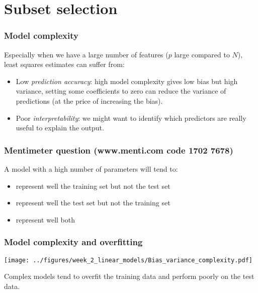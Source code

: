 \documentclass[notes]{beamer}          %
\begin{document}
\section{Subset selection}

\begin{frame}
\frametitle{Model complexity}

Especially when we have a large number of features ($p$ large compared to $N$), least squares estimates can suffer from:

\begin{itemize}
    \item Low \textit{prediction accuracy}: high model complexity gives low bias but high variance, setting some coefficients to zero can reduce the variance of predictions (at the price of increasing the bias).
    \item Poor \textit{interpretability}: we might want to identify which predictors are really useful to explain the output.
\end{itemize}

\end{frame}


\begin{frame}
\frametitle{Mentimeter question (www.menti.com code 1702 7678)}

A model with a high number of parameters will tend to:
\begin{itemize}
    \item represent well the training set but not the test set
    \item represent well the test set but not the training set
    \item represent well both
\end{itemize}
\end{frame}


\begin{frame}
\frametitle{Model complexity and overfitting}

\begin{center}
\texttt{[image: ../figures/week\_2\_linear\_models/Bias\_variance\_complexity.pdf]}
\end{center}

Complex models tend to overfit the training data and perform poorly on the test data.

\end{frame}
\end{document}
